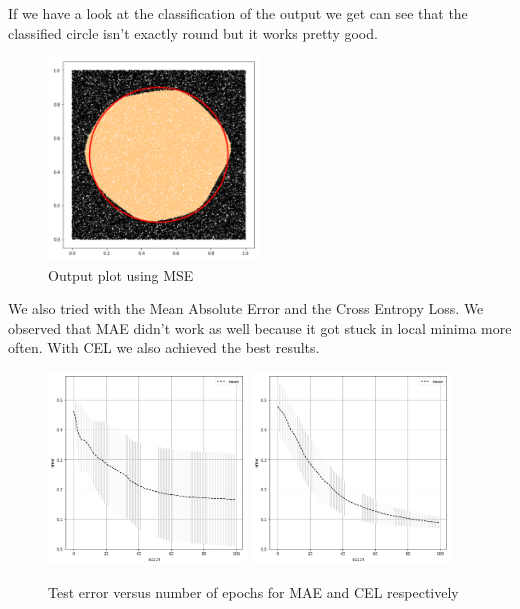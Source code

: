 \documentclass{article}
\begin{document}
If we have a look at the classification of the output we get can see that the classified circle isn't exactly round but it works pretty good. 

\begin{figure}[H]
\begin{center}
\includegraphics[width=0.5\textwidth]{mse_plot}
\caption{Output plot using MSE}
\end{center}
\end{figure}


We also tried with the Mean Absolute Error and the Cross Entropy Loss. We observed that MAE didn't work as well because it got stuck in local minima more often. With CEL we also achieved the best results.  
\begin{figure}[H]
\begin{center}
\includegraphics[width=0.47\textwidth]{err_mae}
\includegraphics[width=0.47\textwidth]{cel_err}
\caption{Test error versus number of epochs for MAE and CEL respectively}
\end{center}
\end{figure}
\end{document}
